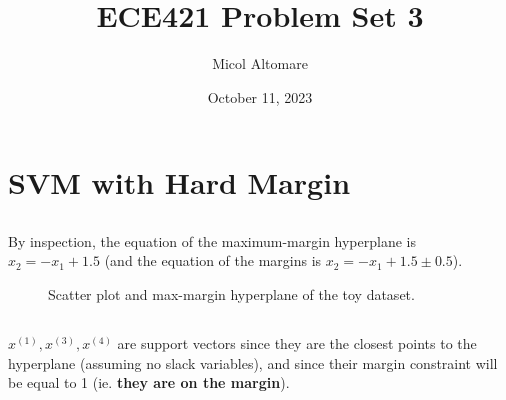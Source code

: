 \documentclass{article}
\title{ECE421 Problem Set 3}
\author{Micol Altomare}
\date{October 11, 2023}
\begin{document}
\maketitle


\section{SVM with Hard Margin}



\subsection{}
By inspection, the equation of the maximum-margin hyperplane is $\boxed{x_2=-x_1+1.5}$ (and the equation of the margins is $x_2=-x_1+1.5 \pm 0.5$).

\begin{figure}[ht]
  \centering
  \caption{Scatter plot and max-margin hyperplane of the toy dataset.}
\end{figure}



\subsection{}
$\boxed{x^{(1)}, x^{(3)}, x^{(4)}}$ are support vectors since they are the closest points to the hyperplane (assuming no slack variables), and since their margin constraint will be equal to 1 (ie. \textbf{they are on the margin}).
\end{document}
